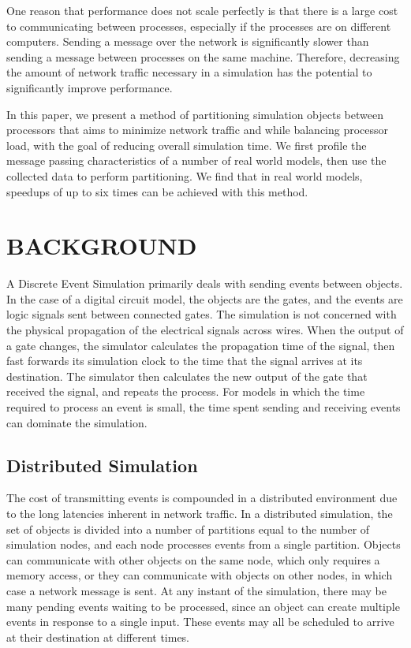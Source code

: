 \documentclass{wscpaperproc}
\begin{document}
One reason that performance does not scale perfectly is that there is a large cost to communicating between processes, especially if the processes are on different computers. Sending a message over the network is significantly slower than sending a message between processes on the same machine. Therefore, decreasing the amount of network traffic necessary in a simulation has the potential to significantly improve performance.

In this paper, we present a method of partitioning simulation objects between processors that aims to minimize network traffic and while balancing processor load, with the goal of reducing overall simulation time. We first profile the message passing characteristics of a number of real world models, then use the collected data to perform partitioning. We find that in real world models, speedups of up to six times can be achieved with this method. 

\section{BACKGROUND}\label{sec:background}

A Discrete Event Simulation primarily deals with sending events between objects. In the case of a digital circuit model, the objects are the gates, and the events are logic signals sent between connected gates. The simulation is not concerned with the physical propagation of the electrical signals across wires. When the output of a gate changes, the simulator calculates the propagation time of the signal, then fast forwards its simulation clock to the time that the signal arrives at its destination. The simulator then calculates the new output of the gate that received the signal, and repeats the process. For models in which the time required to process an event is small, the time spent sending and receiving events can dominate the simulation.

\subsection{Distributed Simulation}

The cost of transmitting events is compounded in a distributed environment due to the long latencies inherent in network traffic. In a distributed simulation, the set of objects is divided into a number of partitions equal to the number of simulation nodes, and each node processes events from a single partition. Objects can communicate with other objects on the same node, which only requires a memory access, or they can communicate with objects on other nodes, in which case a network message is sent. At any instant of the simulation, there may be many pending events waiting to be processed, since an object can create multiple events in response to a single input. These events may all be scheduled to arrive at their destination at different times.
\end{document}
